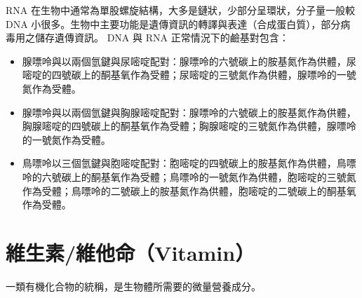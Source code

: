 \documentclass[a4paper,12pt]{report}
\begin{document}
\begin{itemize}
\begin{itemize}
RNA 在生物中通常為單股螺旋結構，大多是鏈狀，少部分呈環狀，分子量一般較 DNA 小很多。生物中主要功能是遺傳資訊的轉譯與表達（合成蛋白質），部分病毒用之儲存遺傳資訊。
DNA 與 RNA 正常情況下的鹼基對包含：
\begin{itemize}
\item 腺嘌呤與以兩個氫鍵與尿嘧啶配對：腺嘌呤的六號碳上的胺基氮作為供體，尿嘧啶的四號碳上的酮基氧作為受體；尿嘧啶的三號氮作為供體，腺嘌呤的一號氮作為受體。
\bct\bfH\ctr{}\ef\FB\ect
\item 腺嘌呤與以兩個氫鍵與胸腺嘧啶配對：腺嘌呤的六號碳上的胺基氮作為供體，胸腺嘧啶的四號碳上的酮基氧作為受體；胸腺嘧啶的三號氮作為供體，腺嘌呤的一號氮作為受體。
\bct\bfH\ctr{}\ef\FB\ect
\item 鳥嘌呤以三個氫鍵與胞嘧啶配對：胞嘧啶的四號碳上的胺基氮作為供體，鳥嘌呤的六號碳上的酮基氧作為受體；鳥嘌呤的一號氮作為供體，胞嘧啶的三號氮作為受體；鳥嘌呤的二號碳上的胺基氮作為供體，胞嘧啶的二號碳上的酮基氧作為受體。
\bct\bfH\ctr{}\ef\FB\ect
\end{itemize}


\section{維生素/維他命（Vitamin）}
一類有機化合物的統稱，是生物體所需要的微量營養成分。

\end{itemize}
\end{itemize}
\end{document}

